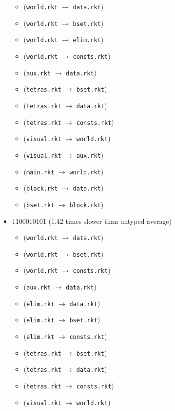 \documentclass{article}
\newcommand{\mono}[1]{\texttt{#1}}
\begin{document}
\begin{itemize}
  \begin{itemize}
  \item (\mono{world.rkt} $\rightarrow$ \mono{data.rkt})
  \item (\mono{world.rkt} $\rightarrow$ \mono{bset.rkt})
  \item (\mono{world.rkt} $\rightarrow$ \mono{elim.rkt})
  \item (\mono{world.rkt} $\rightarrow$ \mono{consts.rkt})
  \item (\mono{aux.rkt} $\rightarrow$ \mono{data.rkt})
  \item (\mono{tetras.rkt} $\rightarrow$ \mono{bset.rkt})
  \item (\mono{tetras.rkt} $\rightarrow$ \mono{data.rkt})
  \item (\mono{tetras.rkt} $\rightarrow$ \mono{consts.rkt})
  \item (\mono{visual.rkt} $\rightarrow$ \mono{world.rkt})
  \item (\mono{visual.rkt} $\rightarrow$ \mono{aux.rkt})
  \item (\mono{main.rkt} $\rightarrow$ \mono{world.rkt})
  \item (\mono{block.rkt} $\rightarrow$ \mono{data.rkt})
  \item (\mono{bset.rkt} $\rightarrow$ \mono{block.rkt})
  \end{itemize}
\item 1100010101 (1.42 times slower than untyped average)
  \begin{itemize}
  \item (\mono{world.rkt} $\rightarrow$ \mono{data.rkt})
  \item (\mono{world.rkt} $\rightarrow$ \mono{bset.rkt})
  \item (\mono{world.rkt} $\rightarrow$ \mono{consts.rkt})
  \item (\mono{aux.rkt} $\rightarrow$ \mono{data.rkt})
  \item (\mono{elim.rkt} $\rightarrow$ \mono{data.rkt})
  \item (\mono{elim.rkt} $\rightarrow$ \mono{bset.rkt})
  \item (\mono{elim.rkt} $\rightarrow$ \mono{consts.rkt})
  \item (\mono{tetras.rkt} $\rightarrow$ \mono{bset.rkt})
  \item (\mono{tetras.rkt} $\rightarrow$ \mono{data.rkt})
  \item (\mono{tetras.rkt} $\rightarrow$ \mono{consts.rkt})
  \item (\mono{visual.rkt} $\rightarrow$ \mono{world.rkt})

\end{itemize}
\end{itemize}
\end{document}
